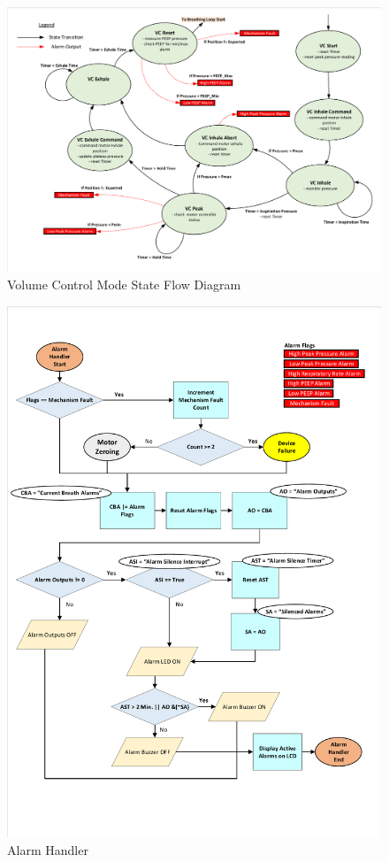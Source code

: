 \documentclass[]{article}
\begin{document}
\begin{figure}
	\includegraphics[scale=0.8, trim = 6 6 6 6, clip]{figures/vc_mode.pdf}
	\caption{Volume Control Mode State Flow Diagram}
	\label{fig:vc_stfd}
\end{figure}

\begin{figure}
	\includegraphics[scale= 0.82, trim=15 70 15 50, clip]{figures/alarm_handler.pdf}
	\caption{Alarm Handler}
	\label{fig:alarm_loop}
\end{figure}
\end{document}
